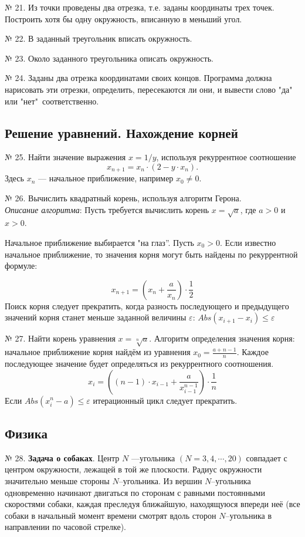 № 21. Из точки проведены два отрезка, т.е. заданы координаты трех точек. Построить хотя бы одну окружность, вписанную в меньший угол.

№ 22. В заданный треугольник вписать окружность.

№ 23. Около заданного треугольника описать окружность.

№ 24. Заданы два отрезка координатами своих концов. Программа должна нарисовать эти отрезки, определить, пересекаются ли они, и вывести слово "да" \: или "нет"\ соответственно. 

\subsection{Решение уравнений. Нахождение корней}

№ 25. Найти значение выражения $x = 1/y$, используя рекуррентное соотношение 
$$x_{n+1} = x_n\cdot (2 - y\cdot x_n).$$ 
Здесь $x_n$ --- начальное приближение, например $x_0\neq 0$.

№ 26. Вычислить квадратный корень, используя алгоритм Герона.\\ {\it Описание алгоритма}: Пусть требуется вычислить корень $x = \sqrt{a}$, где $a>0$ и $x>0$.
 
Начальное   приближение выбирается "на глаз”. Пусть  $x_0 > 0$. Если известно начальное приближение, то значения корня могут быть найдены по рекуррентной формуле:

$$x_{n+1} = \left(x_n + \frac{a}{x_n}\right)\cdot\frac{1}{2}$$
Поиск корня следует прекратить, когда разность последующего и предыдущего значений корня станет меньше заданной величины $\varepsilon$:
$Abs(x_{i+1}-x_i)\leq\varepsilon$

№ 27. Найти корень уравнения $x = \sqrt[n]{a}$. Алгоритм опреде­ления значения корня: начальное приближение корня  найдём из уравнения    $x_0 = \frac{a + n -1}{n} $.  Каждое последующее значение будет определяться из рекуррентного соотношения. 
$$x_i = \left((n-1)\cdot x_{i-1} + \frac{a}{x^{n-1}_{i-1}}   \right)\cdot\frac{1}{n}$$
Если $Abs(x^n_{i}-a)\leq\varepsilon$ итерационный цикл следует прекратить. 


\subsection{Физика}

№ 28. {\bf Задача о собаках}.
Центр $N$ ---угольника $(N = 3, 4,\cdots, 20)$ совпадает с центром окружности, лежащей в той же плоскости. Радиус окружности значительно меньше стороны $N$--угольника. Из вершин $N$--угольника одновременно начинают двигаться по сторонам с равными постоянными скоростями собаки, каждая преследуя ближайшую, находящуюся впереди неё (все собаки в начальный момент времени смотрят вдоль сторон $N$--угольника в направлении по часовой стрелке).

